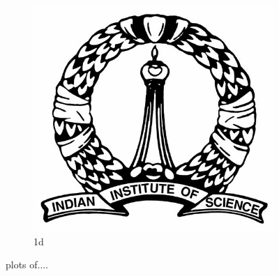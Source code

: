 \documentclass[10pt,a4paper]{article}
\begin{document}
\begin{figure}
    \begin{subfigure}{.48\textwidth}
        \centering
        \includegraphics[width=.8\linewidth]{IISc_logo.jpg}
        \caption{1d}
        \label{fig:sfig4}
    \end{subfigure}

    \caption{plots of....}
    \label{fig:fig}
\end{figure}
\end{document}
